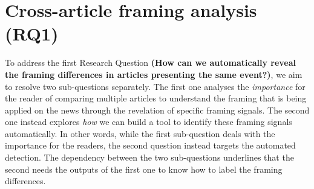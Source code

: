 



\section{Cross-article framing analysis (RQ1)}
\label{sec:prop_rq1}

To address the first Research Question
\textbf{(How can we automatically reveal the framing differences in articles presenting the same event?)}, we aim to resolve two sub-questions separately. The first one analyses the \emph{importance} for the reader of comparing multiple articles to understand the framing that is being applied on the news through the revelation of specific framing signals. The second one instead explores \emph{how} we can build a tool to identify these framing signals automatically.
In other words, while the first sub-question deals with the importance for the readers, the second question instead targets the automated detection.
The dependency between the two sub-questions underlines that the second needs the outputs of the first one to know how to label the framing differences.



